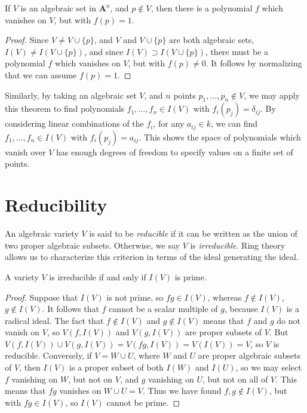 \begin{corollary}
    If $V$ is an algebraic set in $\mathbf{A}^n$, and $p \not \in V$, then there is a polynomial $f$ which vanishes on $V$, but with $f(p) = 1$.
\end{corollary}
\begin{proof}
    Since $V \neq V \cup \{ p \}$, and $V$ and $V \cup \{ p \}$ are both algebraic sets, $I(V) \neq I(V \cup \{ p \})$, and since $I(V) \supset I(V \cup \{ p \})$, there must be a polynomial $f$ which vanishes on $V$, but with $f(p) \neq 0$. It follows by normalizing that we can assume $f(p) = 1$.
\end{proof}

Similarly, by taking an algebraic set $V$, and $n$ points $p_1, \dots, p_n \not \in V$, we may apply this theorem to find polynomials $f_1, \dots, f_n \in I(V)$ with $f_i(p_j) = \delta_{ij}$. By considering linear combinations of the $f_i$, for any $a_{ij} \in k$, we can find $f_1, \dots, f_n \in I(V)$ with $f_i(p_j) = a_{ij}$. This shows the space of polynomials which vanish over $V$ has enough degrees of freedom to specify values on a finite set of points.

\section{Reducibility}

An algebraic variety $V$ is said to be \emph{reducible} if it can be written as the union of two proper algebraic subsets. Otherwise, we say $V$ is \emph{irreducible}. Ring theory allows us to characterize this criterion in terms of the ideal generating the ideal.

\begin{prop}
    A variety $V$ is irreducible if and only if $I(V)$ is prime.
\end{prop}
\begin{proof}
    Suppose that $I(V)$ is not prime, so $fg \in I(V)$, whereas $f \not \in I(V)$, $g \not \in I(V)$. It follows that $f$ cannot be a scalar multiple of $g$, because $I(V)$ is a radical ideal. The fact that $f \not \in I(V)$ and $g \not \in I(V)$ means that $f$ and $g$ do not vanish on $V$, so $V(f, I(V))$ and $V(g, I(V))$ are proper subsets of $V$. But $V(f, I(V)) \cup V(g, I(V)) = V(fg, I(V)) = V(I(V)) = V$, so $V$ is reducible. Conversely, if $V = W \cup U$, where $W$ and $U$ are proper algebraic subsets of $V$, then $I(V)$ is a proper subset of both $I(W)$ and $I(U)$, so we may select $f$ vanishing on $W$, but not on $V$, and $g$ vanishing on $U$, but not on all of $V$. This means that $fg$ vanishes on $W \cup U = V$. Thus we have found $f,g \not \in I(V)$, but with $fg \in I(V)$, so $I(V)$ cannot be prime.
\end{proof}

